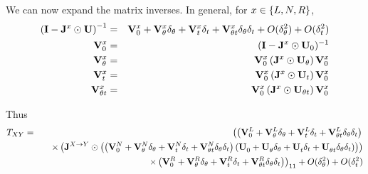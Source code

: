 \documentclass{article}
\begin{document}
We can now expand the matrix inverses.
In general, for $x \in \{ L, N, R \}$,
\begin{eqnarray*}
  \left( {\bf I} - {\bf J}^x \odot {\bf U} \right)^{-1}
  & = & {\bf V}_0^{x} + {\bf V}_\theta^{x} \delta_\theta + {\bf V}_t^{x} \delta_t + {\bf V}_{\theta t}^{x} \delta_\theta \delta_t + O(\delta_\theta^2) + O(\delta_t^2) \\
{\bf V}^x_0 & = & ({\bf I} - {\bf J}^x \odot {\bf U}_0)^{-1} \\
{\bf V}^x_\theta & = & {\bf V}^x_0 \left( {\bf J}^x \odot {\bf U}_\theta \right) {\bf V}^x_0 \\
{\bf V}^x_t & = & {\bf V}^x_0 \left( {\bf J}^x \odot {\bf U}_t \right) {\bf V}^x_0 \\
{\bf V}^x_{\theta t} & = & {\bf V}^x_0 \left( {\bf J}^x \odot {\bf U}_{\theta t} \right) {\bf V}^x_0
\end{eqnarray*}

Thus
\begin{eqnarray*}
T_{XY} & = &
\left(
\left( {\bf V}_0^{L} + {\bf V}_\theta^{L} \delta_\theta + {\bf V}_t^{L} \delta_t + {\bf V}_{\theta t}^{L} \delta_\theta \delta_t \right)
\right. \\ & & \quad \times
\left(
     {\bf J}^{X \to Y} \odot
     \left( \left( {\bf V}_0^{N} + {\bf V}_\theta^{N} \delta_\theta + {\bf V}_t^{N} \delta_t + {\bf V}_{\theta t}^{N} \delta_\theta \delta_t \right)
     \left( {\bf U}_0^{} + {\bf U}_\theta^{} \delta_\theta + {\bf U}_t^{} \delta_t + {\bf U}_{\theta t}^{} \delta_\theta \delta_t \right) \right)
\right)
 \\ & & \quad \left. \times
 \left( {\bf V}_0^{R} + {\bf V}_\theta^{R} \delta_\theta + {\bf V}_t^{R} \delta_t + {\bf V}_{\theta t}^{R} \delta_\theta \delta_t \right)
\right)_{11}  + O(\delta_\theta^2) + O(\delta_t^2)
\end{eqnarray*}
\end{document}
